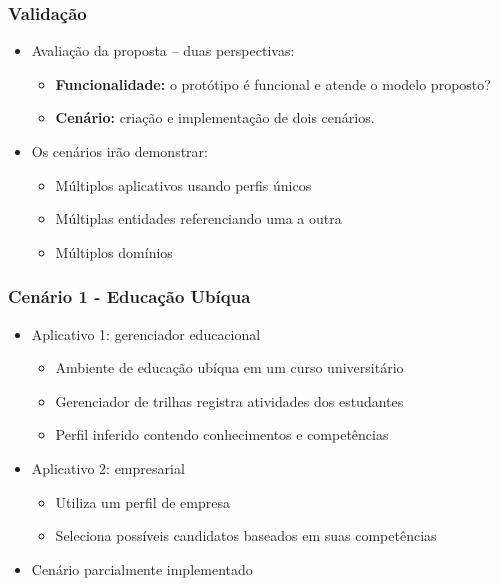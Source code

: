 \documentclass[14pt]{beamer}
\begin{document}
\begin{frame}
  \frametitle{Validação}
  \begin{itemize}
    \item Avaliação da proposta -- duas perspectivas:
    \begin{itemize}
      \item {\bf Funcionalidade:} o protótipo é funcional e atende o modelo proposto?
      \item {\bf Cenário:} criação e implementação de dois cenários.
    \end{itemize}
  \end{itemize}

	\begin{itemize}
		\item Os cenários irão demonstrar:
		\begin{itemize}
			\item Múltiplos aplicativos usando perfis únicos
			\item Múltiplas entidades referenciando uma a outra
			\item Múltiplos domínios
		\end{itemize}
	\end{itemize}

\end{frame}


\begin{frame}
	\frametitle{Cenário 1 - Educação Ubíqua}

	\begin{itemize}
		\item Aplicativo 1: gerenciador educacional
		\begin{itemize}
			\item Ambiente de educação ubíqua em um curso universitário
			\item Gerenciador de trilhas registra atividades dos estudantes
			\item Perfil inferido contendo conhecimentos e competências
		\end{itemize}
		\item Aplicativo 2: empresarial
		\begin{itemize}
			\item Utiliza um perfil de empresa
			\item Seleciona possíveis candidatos baseados em suas competências
		\end{itemize}
		\item Cenário parcialmente implementado
	\end{itemize}
\end{frame}
\end{document}
